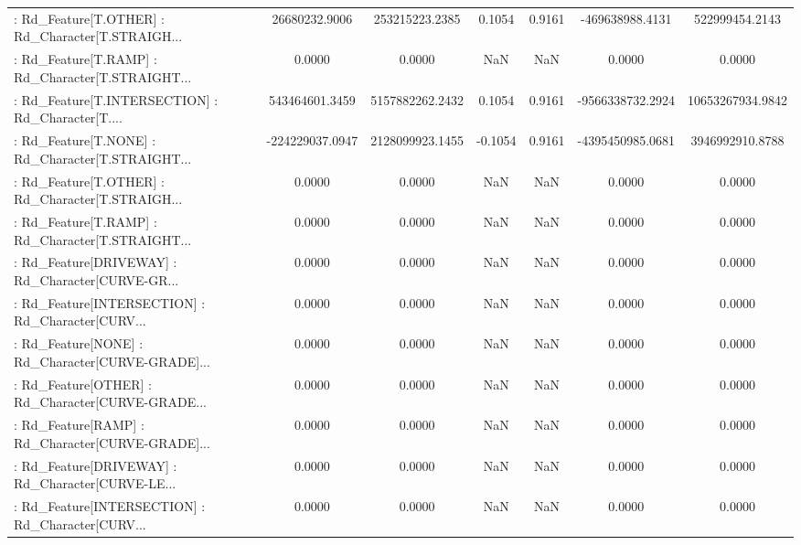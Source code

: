 \begin{longtable}{p{4cm}cccccc}
 : Rd\_Feature[T.OTHER] : Rd\_Character[T.STRAIGH... &     26680232.9006 &    253215223.2385 &  0.1054 &       0.9161 &    -469638988.4131 &    522999454.2143 \\
 : Rd\_Feature[T.RAMP] : Rd\_Character[T.STRAIGHT... &            0.0000 &            0.0000 &     NaN &          NaN &             0.0000 &            0.0000 \\
 : Rd\_Feature[T.INTERSECTION] : Rd\_Character[T.... &    543464601.3459 &   5157882262.2432 &  0.1054 &       0.9161 &   -9566338732.2924 &  10653267934.9842 \\
 : Rd\_Feature[T.NONE] : Rd\_Character[T.STRAIGHT... &   -224229037.0947 &   2128099923.1455 & -0.1054 &       0.9161 &   -4395450985.0681 &   3946992910.8788 \\
 : Rd\_Feature[T.OTHER] : Rd\_Character[T.STRAIGH... &            0.0000 &            0.0000 &     NaN &          NaN &             0.0000 &            0.0000 \\
 : Rd\_Feature[T.RAMP] : Rd\_Character[T.STRAIGHT... &            0.0000 &            0.0000 &     NaN &          NaN &             0.0000 &            0.0000 \\
 : Rd\_Feature[DRIVEWAY] : Rd\_Character[CURVE-GR... &            0.0000 &            0.0000 &     NaN &          NaN &             0.0000 &            0.0000 \\
 : Rd\_Feature[INTERSECTION] : Rd\_Character[CURV... &            0.0000 &            0.0000 &     NaN &          NaN &             0.0000 &            0.0000 \\
 : Rd\_Feature[NONE] : Rd\_Character[CURVE-GRADE]... &            0.0000 &            0.0000 &     NaN &          NaN &             0.0000 &            0.0000 \\
 : Rd\_Feature[OTHER] : Rd\_Character[CURVE-GRADE... &            0.0000 &            0.0000 &     NaN &          NaN &             0.0000 &            0.0000 \\
 : Rd\_Feature[RAMP] : Rd\_Character[CURVE-GRADE]... &            0.0000 &            0.0000 &     NaN &          NaN &             0.0000 &            0.0000 \\
 : Rd\_Feature[DRIVEWAY] : Rd\_Character[CURVE-LE... &            0.0000 &            0.0000 &     NaN &          NaN &             0.0000 &            0.0000 \\
 : Rd\_Feature[INTERSECTION] : Rd\_Character[CURV... &            0.0000 &            0.0000 &     NaN &          NaN &             0.0000 &            0.0000 \\

\end{longtable}
